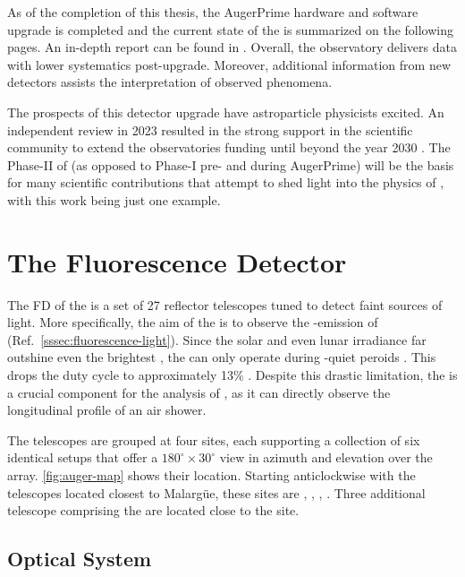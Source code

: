 As of the completion of this thesis, the AugerPrime hardware and software 
upgrade is completed and the current state of the \PAO is summarized on the 
following pages. An in-depth report can be found in
\cite{collaborationPierreAugerObservatory2011}. Overall, the observatory 
delivers data with lower systematics post-upgrade. Moreover, additional 
information from new detectors assists the interpretation of observed 
phenomena. 

The prospects of this detector upgrade have astroparticle physicists excited. 
An independent review in 2023 resulted in the strong support in the scientific 
community to extend the observatories funding until beyond the year 2030 
\cite{castellinaOutcomeFinanceBoard2023}. The Phase-II of \DAQ (as opposed to 
Phase-I pre- and during AugerPrime) will be the basis for many scientific 
contributions that attempt to shed light into the physics of \UHECRs, with this
work being just one example.

\section{The Fluorescence Detector}
\label{sec:fd}

The \acf{FD} of the \PAO is a set of 27 reflector telescopes tuned to detect 
faint sources of \UV light. More specifically, the aim of the \FD is to observe
the \UV-emission of \EAS (Ref.\ \cref{sssec:fluorescence-light}). Since the 
solar and even lunar irradiance far outshine even the brightest \EASs, the \FD
can only operate during \UV-quiet peroids \cite{mathesCriteriaFDShift}. This 
drops the duty cycle to approximately 13\% 
\cite{abrahamFluorescenceDetectorPierre2010}. Despite this drastic limitation, 
the \FD is a crucial component for the analysis of \EASs, as it can directly 
observe the longitudinal profile of an air shower.

The telescopes are grouped at four \FD sites, each supporting a collection of 
six identical setups that offer a $180^\circ\times30^\circ$ view in azimuth and
elevation over the \SD array. \cref{fig:auger-map} shows their location. 
Starting anticlockwise with the telescopes located closest to Malargüe, these 
sites are \LL, \LM, \LA, \CO. Three additional telescope comprising the \HEATs
are located close to the \CO site.

\subsection{Optical System}
\label{ssec:fd-design}

